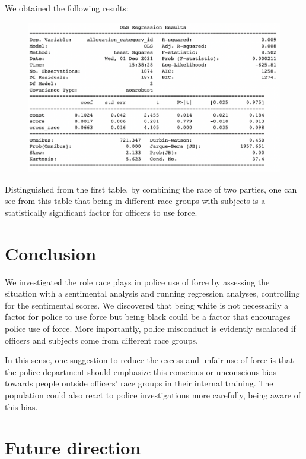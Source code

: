 \documentclass[10pt]{article}
\begin{document}
We obtained the following results:

\begin{figure}[H]
\centering
\includegraphics[width=\textwidth]{regression2}
\end{figure}

Distinguished from the first table, by combining the race of two parties, one can see from this table that being in different race groups with subjects is a statistically significant factor for officers to use force. 



\section{Conclusion}

We investigated the role race plays in police use of force by assessing the situation with a sentimental analysis and running regression analyses, controlling for the sentimental scores.
We discovered that being white is not necessarily a factor for police to use force but being black could be a factor that encourages police use of force. More importantly, police misconduct is evidently escalated if officers and subjects come from different race groups.

In this sense, one suggestion to reduce the excess and unfair use of force is that the police department should emphasize this conscious or unconscious bias towards people outside officers’ race groups in their internal training. The population could also react to police investigations more carefully, being aware of this bias.  



\section{Future direction}
\end{document}
